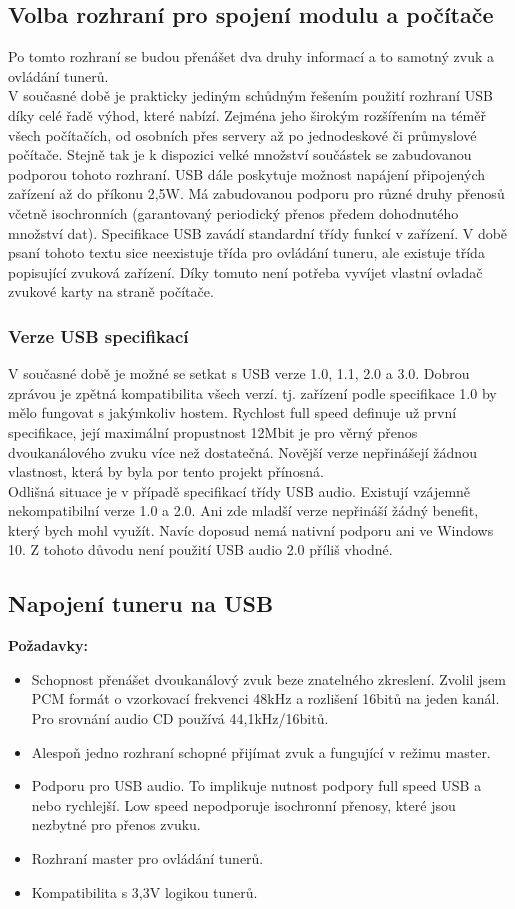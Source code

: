 \subsection{Volba rozhraní pro spojení modulu a počítače}
Po tomto rozhraní se budou přenášet dva druhy informací a to samotný zvuk a ovládání tunerů.\\
V současné době je prakticky jediným schůdným řešením použití rozhraní USB díky celé řadě výhod, které nabízí. Zejména jeho širokým rozšířením na téměř všech počítačích, od osobních přes servery až po jednodeskové či průmyslové počítače. Stejně tak je k dispozici velké množství součástek se zabudovanou podporou tohoto rozhraní. USB dále poskytuje možnost napájení připojených zařízení až do příkonu 2,5W. Má zabudovanou podporu pro různé druhy přenosů včetně isochronních (garantovaný periodický přenos předem dohodnutého množství dat). Specifikace USB zavádí standardní třídy funkcí v zařízení. V době psaní tohoto textu sice neexistuje třída pro ovládání tuneru, ale existuje třída popisující zvuková zařízení. Díky tomuto není potřeba vyvíjet vlastní ovladač zvukové karty na straně počítače.
\subsubsection{Verze USB specifikací}
V současné době je možné se setkat s USB verze 1.0, 1.1, 2.0 a 3.0. Dobrou zprávou je zpětná kompatibilita všech verzí. tj. zařízení podle specifikace 1.0 by mělo fungovat s jakýmkoliv hostem. Rychlost full speed definuje už první specifikace, její maximální propustnost 12Mbit je pro věrný přenos dvoukanálového zvuku více než dostatečná. Novější verze nepřinášejí žádnou vlastnost, která by byla por tento projekt přínosná.\\
Odlišná situace je v případě specifikací třídy USB audio. Existují vzájemně nekompatibilní verze 1.0 a 2.0. Ani zde mladší verze nepřináší žádný benefit, který bych mohl využít. Navíc doposud nemá nativní podporu ani ve Windows 10. Z tohoto důvodu není použití USB audio 2.0 příliš vhodné.


\subsection{Napojení tuneru na USB}
\textbf{Požadavky:\\}
\begin{itemize}
\item{Schopnost přenášet dvoukanálový zvuk beze znatelného zkreslení. Zvolil jsem PCM formát o vzorkovací frekvenci 48kHz a rozlišení 16bitů na jeden kanál. Pro srovnání audio CD používá 44,1kHz/16bitů.}
\item{Alespoň jedno rozhraní \iis schopné přijímat zvuk a fungující v režimu master.}
\item{Podporu pro USB audio. To implikuje nutnost podpory full speed USB a nebo rychlejší. Low speed nepodporuje isochronní přenosy, které jsou nezbytné pro přenos zvuku.}
\item{Rozhraní \iic master pro ovládání tunerů.}
\item{Kompatibilita s 3,3V logikou tunerů.}
\end{itemize}

